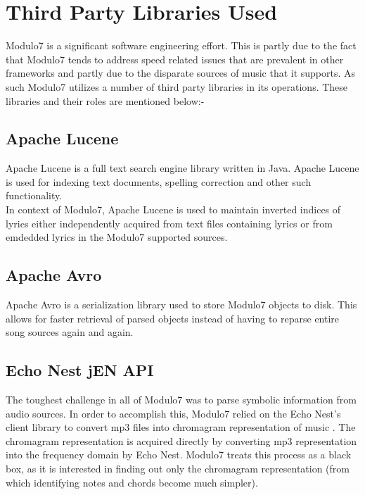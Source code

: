 \appendix
{}
\chapter{Third Party Libraries Used}

\noindent Modulo7 is a significant software engineering effort. This is partly due to the fact that Modulo7 tends to address speed related issues that are prevalent in other frameworks and partly due to the disparate sources of music that it supports. As such Modulo7 utilizes a number of third party libraries in its operations. These libraries and their roles are mentioned below:-

\section{Apache Lucene}

\noindent Apache Lucene is a full text search engine library written in Java. Apache Lucene is used for indexing text documents, spelling correction and other such functionality. \\
In context of Modulo7, Apache Lucene is used to maintain inverted indices of lyrics either independently acquired from text files containing lyrics or from emdedded lyrics in the Modulo7 supported sources. 

\section{Apache Avro}

\noindent Apache Avro is a serialization library used to store Modulo7 objects to disk. This allows for faster retrieval of parsed objects instead of having to reparse entire song sources again and again.

\section{Echo Nest jEN API}

\noindent The toughest challenge in all of Modulo7 was to parse symbolic information from audio sources. In order to accomplish this, Modulo7 relied on the Echo Nest's client library to convert mp3 files into chromagram representation of music \cite{chromagramtutorial}. The chromagram representation is acquired directly by converting mp3 representation into the frequency domain by Echo Nest. Modulo7 treats this process as a black box, as it is interested in finding out only the chromagram representation (from which identifying notes and chords become much simpler). 

